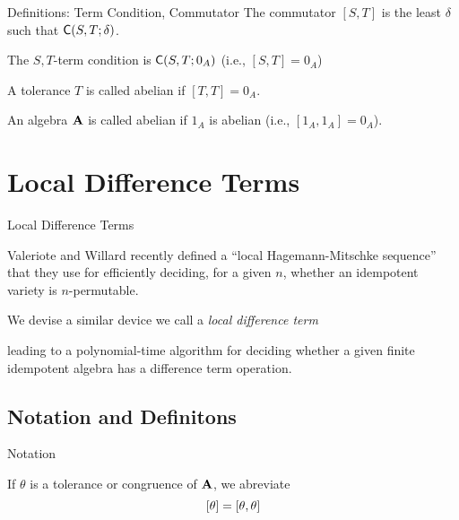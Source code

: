 \documentclass[12pt,xcolor=dvipsnames%
   ]{beamer}
\renewcommand{\cite}[1]{\relax}
\renewcommand{\defn}[1]{\alert{#1}}
\newcommand{\defin}[1]{\alert{#1}}
\begin{document}
\begin{frame}{Definitions: Term Condition, Commutator}
  The \defin{commutator} $[S, T]$ is the least
  $\delta$ such that $\mathsf{C}(S, T; \delta)$.

  The \defin{$S, T$-term condition} is $\mathsf{C}(S, T; 0_A)$ (i.e., $[S,T] = 0_A$)

  A tolerance $T$ is called \defin{abelian} if $[T, T] = 0_A$.  

  An algebra $\mathbf{A}$ is called \defin{abelian} if $1_A$ is abelian
  (i.e., $[1_A,1_A] = 0_A$).

\end{frame}

\section{Local Difference Terms}
\begin{frame}{Local Difference Terms}

Valeriote and Willard recently defined %
a ``local Hagemann-Mitschke sequence'' that they use for
efficiently deciding, for a given $n$, whether an idempotent
variety is $n$-permutable. 

  \bigskip

  We devise a similar device we call a
  \emph{\alert{local difference term}}

  leading to a polynomial-time
  algorithm for deciding whether a given finite idempotent algebra
  has a difference term operation.

\end{frame}

\subsection{Notation and Definitons}
\begin{frame}{Notation}

  If $\theta$ is a tolerance or congruence of $\mathbf{A}$, we abreviate
  {\Large  \[
  [\theta]= [\theta, \theta]
  \]}
\vfill
\end{frame}
\end{document}
